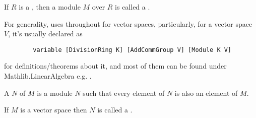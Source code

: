 \begin{definition}
    \label{VectorSpace}
    \leanok

    If $R$ is a , then a module $M$ over $R$ is called a .

\end{definition}

\begin{remark}
    \label{mk:VectorSpace}

    For generality, \Mathlib uses  throughout for vector spaces,
    particularly, for a vector space $V$, it's usually declared as

    \begin{lstlisting}
        variable [DivisionRing K] [AddCommGroup V] [Module K V]
    \end{lstlisting}

    for definitions/theorems about it, and most of them can be found under \textsf{Mathlib.LinearAlgebra} e.g. .
    
\end{remark}

\begin{remark}
    \label{mk:Submodule}

    A  $N$ of $M$ is a module $N$ such that every element of $N$ is also an element of $M$.

    If $M$ is a vector space then $N$ is called a .

\end{remark}





    
